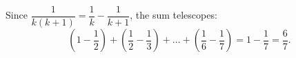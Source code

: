 Since $\dfrac{1}{k(k+1)}=\dfrac{1}{k}-\dfrac{1}{k+1}$, the sum telescopes:
\[
\left(1-\dfrac{1}{2}\right)+\left(\dfrac{1}{2}-\dfrac{1}{3}\right)+\dots+\left(\dfrac{1}{6}-\dfrac{1}{7}\right)=1-\dfrac{1}{7}=\boxed{\dfrac{6}{7}}.
\]
